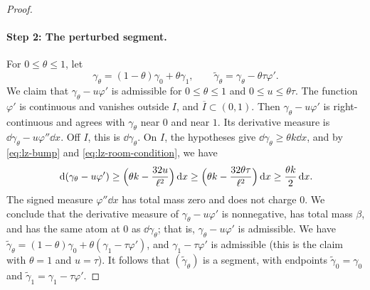 \begin{proof}
\paragraph{Step 2: The perturbed segment.}
For $0\le\theta\le1$, let
\[
 \gamma_\theta=(1-\theta)\gamma_0+\theta\gamma_1,\qquad
 \widetilde\gamma_\theta=\gamma_\theta-\theta\tau\varphi'.
\]
We claim that $\gamma_\theta-u\varphi'$ is admissible for $0\le\theta\le1$ and
$0\le u\le\theta\tau$. The function $\varphi'$ is continuous and vanishes
outside $I$, and $\overline I\subset(0,1)$. Then $\gamma_\theta-u\varphi'$ is
right-continuous and agrees with $\gamma_\theta$ near $0$ and near $1$. Its
derivative measure is $\dd\gamma_\theta-u\varphi''\dd x$. Off $I$, this is
$\dd\gamma_\theta$. On $I$, the hypotheses give $\dd\gamma_\theta\ge\theta
k\dd x$, and by \eqref{eq:lz-bump} and \eqref{eq:lz-room-condition}, we have
\[
 \,\mathrm d(\gamma_\theta-u\varphi')
 \ge\Bigl(\theta k-\frac{32u}{\ell^2}\Bigr)\,\mathrm d x
 \ge\Bigl(\theta k-\frac{32\theta\tau}{\ell^2}\Bigr)\,\mathrm d x
 \ge\frac{\theta k}2\,\mathrm d x .
\]
The signed measure $\varphi''\dd x$ has total mass zero and does not charge
$0$. We conclude that the derivative measure of $\gamma_\theta-u\varphi'$ is
nonnegative, has total mass $\beta$, and has the same atom at $0$ as
$\dd\gamma_\theta$; that is, $\gamma_\theta-u\varphi'$ is admissible. We have
$\widetilde\gamma_\theta=(1-\theta)\gamma_0+\theta(\gamma_1-\tau\varphi')$, and
$\gamma_1-\tau\varphi'$ is admissible (this is the claim with $\theta=1$ and $u=\tau$). It
follows that $(\widetilde\gamma_\theta)$ is a segment, with endpoints
$\widetilde\gamma_0=\gamma_0$ and $\widetilde\gamma_1=\gamma_1-\tau\varphi'$.


\end{proof}
